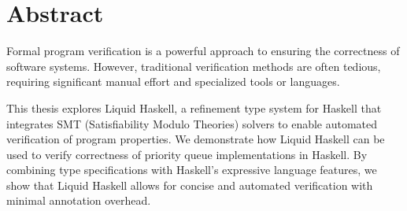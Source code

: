 
\clearpage
{}
\section*{Abstract}

\begin{center}
	\begin{minipage}[t]{0.7\textwidth}

		Formal program verification is a powerful approach to ensuring
		the correctness of software systems.
		However, traditional verification methods are often tedious,
		requiring significant manual effort and specialized tools or languages.

		This thesis explores Liquid Haskell, a refinement type
		system for Haskell that integrates SMT (Satisfiability Modulo Theories)
		solvers to enable automated verification of program properties.
		We demonstrate how Liquid Haskell can be used to verify
		correctness of priority queue
		implementations in Haskell.
		By combining type specifications with Haskell’s expressive
		language features, we show that Liquid Haskell allows for concise
		and automated verification with minimal annotation overhead.
	\end{minipage}
\end{center}

\vfill




\thispagestyle{empty}

